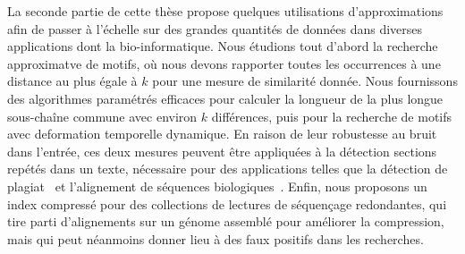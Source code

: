 La seconde partie de cette thèse propose quelques utilisations d'approximations afin de passer à l'échelle sur des grandes quantités de données dans diverses applications dont la bio-informatique.
%
Nous étudions tout d'abord la recherche approximatve de motifs, où nous devons rapporter toutes les occurrences à une distance au plus égale à $k$ pour une mesure de similarité donnée.
Nous fournissons des algorithmes paramétrés efficaces pour calculer la longueur de la plus longue sous-chaîne commune avec environ $k$ différences, puis pour la recherche de motifs avec deformation temporelle dynamique. En raison de leur robustesse au bruit dans l'entrée, ces deux mesures peuvent être appliquées à la détection sections repétés dans un texte, nécessaire pour des applications telles que la détection de plagiat~\cite{zou2010cluster} et l'alignement de séquences biologiques~\cite{leimeister2014kmacs,loose2016real,han2018accurate}.
Enfin, nous proposons un index compressé pour des collections de lectures de séquençage redondantes, qui tire parti d'alignements sur un génome assemblé pour améliorer la compression, mais qui peut néanmoins donner lieu à des faux positifs dans les recherches.